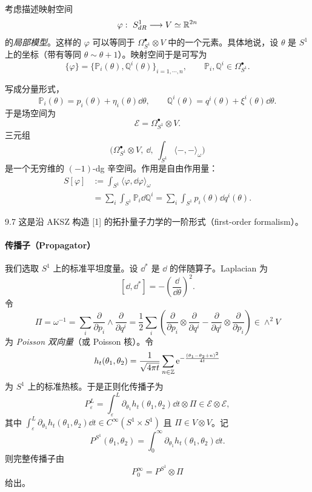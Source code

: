考虑描述映射空间
\[
  \varphi:\ S^{1}_{dR}\longrightarrow V\simeq\R^{2n}
\]
的\emph{局部模型}。这样的 $\varphi$ 可以等同于 $\Omega^{\bullet}_{S^{1}}\otimes V$
中的一个元素。具体地说，设 $\theta$ 是 $S^{1}$ 上的坐标（带有等同
$\theta\sim\theta+1$）。映射空间于是可写为
\[
  \{\varphi\}=\big\{\mathbb{P}_i(\theta),\mathbb{Q}^{i}(\theta)\big\}_{i=1,\cdots,n},
  \qquad \mathbb{P}_i,\mathbb{Q}^{i}\in\Omega^{\bullet}_{S^{1}}.
\]


写成分量形式，
\[
  \mathbb{P}_i(\theta)=p_i(\theta)+\eta_i(\theta)\dd\theta,
  \qquad
  \mathbb{Q}^{i}(\theta)=q^{i}(\theta)+\xi^{i}(\theta)\dd\theta.
\]
于是场空间为
\[
  \mathcal{E}=\Omega^{\bullet}_{S^{1}}\otimes V.
\]
三元组
\[
  \Big(\Omega^{\bullet}_{S^{1}}\otimes V,\ \dd,\
  \int_{S^{1}}\langle-,-\rangle_{\omega}\Big)
\]
是一个无穷维的 $(-1)$-dg 辛空间。作用是自由作用量：
\[
  \begin{aligned}
    S[\varphi]
      &:=\int_{S^{1}}\langle\varphi,\dd\varphi\rangle_{\omega}\\
      &=\sum_i\int_{S^{1}}\mathbb{P}_i\dd\mathbb{Q}^{i}
      =\sum_i\int_{S^{1}}p_i(\theta)\dd q^{i}(\theta).
  \end{aligned}
\]

\begin{wrem}{9.7}
  这是沿 AKSZ 构造 \textup{[1]} 的拓扑量子力学的一阶形式（first-order formalism）。
\end{wrem}

\paragraph{传播子（Propagator）}

我们选取 $S^{1}$ 上的标准平坦度量。设 $\dd^{*}$ 是 $\dd$ 的伴随算子。Laplacian 为
\[
  [\dd,\dd^{*}]=-\left(\frac{\dd}{\dd\theta}\right)^{2}.
\]
令
\[
  \Pi=\omega^{-1}
  =\sum_i\frac{\partial}{\partial p_i}\wedge\frac{\partial}{\partial q^{i}}
  =\frac12\sum_i\left(
    \frac{\partial}{\partial p_i}\otimes\frac{\partial}{\partial q^{i}}
    -\frac{\partial}{\partial q^{i}}\otimes\frac{\partial}{\partial p_i}
  \right)\in\wedge^{2}V
\]
为 \emph{Poisson 双向量}（或 Poisson 核）。令
\[
  h_t(\theta_1,\theta_2)=\frac{1}{\sqrt{4\pi t}}
  \sum_{n\in\mathbb{Z}}\mathrm{e}^{-\frac{(\theta_1-\theta_2+n)^{2}}{4t}}
\]
为 $S^{1}$ 上的标准热核。于是正则化传播子为
\[
  P^{L}_{\varepsilon}=\int_{\varepsilon}^{L}
  \partial_{\theta_1}h_t(\theta_1,\theta_2)\dd t\otimes\Pi
  \in\mathcal{E}\otimes\mathcal{E},
\]
其中 $\int_{\varepsilon}^{L}\partial_{\theta_1}h_t(\theta_1,\theta_2)\dd t
\in C^{\infty}(S^{1}\times S^{1})$ 且 $\Pi\in V\otimes V$。记
\[
  P^{S^{1}}(\theta_1,\theta_2)
  =\int_{0}^{\infty}\partial_{\theta_1}h_t(\theta_1,\theta_2)\dd t.
\]
则完整传播子由
\[
  P^{\infty}_{0}=P^{S^{1}}\otimes\Pi
\]
给出。

